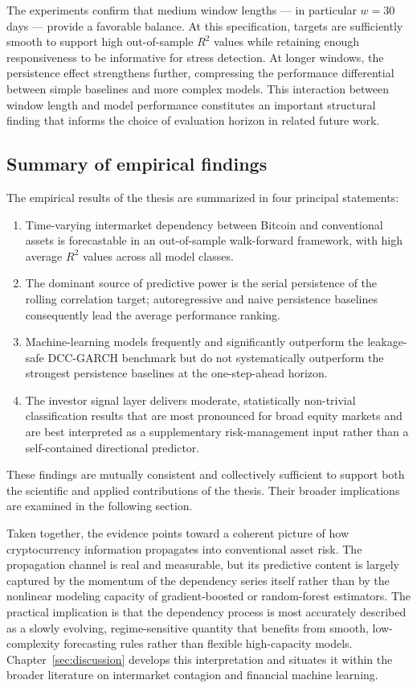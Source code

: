 The experiments confirm that medium window lengths --- in particular $w = 30$ days --- provide a favorable balance. At this specification, targets are sufficiently smooth to support high out-of-sample $R^2$ values while retaining enough responsiveness to be informative for stress detection. At longer windows, the persistence effect strengthens further, compressing the performance differential between simple baselines and more complex models. This interaction between window length and model performance constitutes an important structural finding that informs the choice of evaluation horizon in related future work.

\subsection{Summary of empirical findings}

The empirical results of the thesis are summarized in four principal statements:

\begin{enumerate}
    \item Time-varying intermarket dependency between Bitcoin and conventional assets is forecastable in an out-of-sample walk-forward framework, with high average $R^2$ values across all model classes.
    \item The dominant source of predictive power is the serial persistence of the rolling correlation target; autoregressive and naive persistence baselines consequently lead the average performance ranking.
    \item Machine-learning models frequently and significantly outperform the leakage-safe DCC-GARCH benchmark but do not systematically outperform the strongest persistence baselines at the one-step-ahead horizon.
    \item The investor signal layer delivers moderate, statistically non-trivial classification results that are most pronounced for broad equity markets and are best interpreted as a supplementary risk-management input rather than a self-contained directional predictor.
\end{enumerate}

These findings are mutually consistent and collectively sufficient to support both the scientific and applied contributions of the thesis. Their broader implications are examined in the following section.

Taken together, the evidence points toward a coherent picture of how cryptocurrency information propagates into conventional asset risk. The propagation channel is real and measurable, but its predictive content is largely captured by the momentum of the dependency series itself rather than by the nonlinear modeling capacity of gradient-boosted or random-forest estimators. The practical implication is that the dependency process is most accurately described as a slowly evolving, regime-sensitive quantity that benefits from smooth, low-complexity forecasting rules rather than flexible high-capacity models. Chapter~\ref{sec:discussion} develops this interpretation and situates it within the broader literature on intermarket contagion and financial machine learning.
